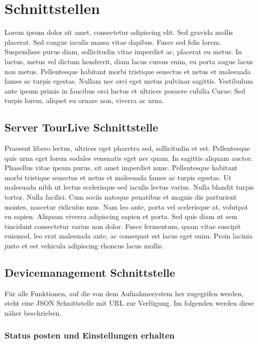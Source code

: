 \chapter{Schnittstellen}


Lorem ipsum dolor sit amet, consectetur adipiscing elit. Sed gravida mollis placerat. Sed congue iaculis massa vitae dapibus. Fusce sed felis lorem. Suspendisse purus diam, sollicitudin vitae imperdiet ac, placerat eu metus. In luctus, metus vel dictum hendrerit, diam lacus cursus enim, eu porta augue lacus non metus. Pellentesque habitant morbi tristique senectus et netus et malesuada fames ac turpis egestas. Nullam nec orci eget metus pulvinar sagittis. Vestibulum ante ipsum primis in faucibus orci luctus et ultrices posuere cubilia Curae; Sed turpis lorem, aliquet eu ornare non, viverra ac urna.

\section{Server TourLive Schnittstelle}

Praesent libero lectus, ultrices eget pharetra sed, sollicitudin et est. Pellentesque quis urna eget lorem sodales venenatis eget nec quam. In sagittis aliquam auctor. Phasellus vitae ipsum purus, sit amet imperdiet nunc. Pellentesque habitant morbi tristique senectus et netus et malesuada fames ac turpis egestas. Ut malesuada nibh ut lectus scelerisque sed iaculis lectus varius. Nulla blandit turpis tortor. Nulla facilisi. Cum sociis natoque penatibus et magnis dis parturient montes, nascetur ridiculus mus. Nam leo ante, porta vel scelerisque at, volutpat eu sapien. Aliquam viverra adipiscing sapien et porta. Sed quis diam ut sem tincidunt consectetur varius non dolor. Fusce fermentum, quam vitae suscipit euismod, leo erat malesuada ante, ac consequat est lacus eget enim. Proin lacinia justo et est vehicula adipiscing rhoncus lacus mollis.

\section{Devicemanagement Schnittstelle}

Für alle Funktionen, auf die von dem Aufnahmesystem her zugegrifen werden, steht eine JSON Schnittstelle mit URL zur Verfügung. Im folgenden werden diese näher beschrieben.

\subsection{Status posten und Einstellungen erhalten}

